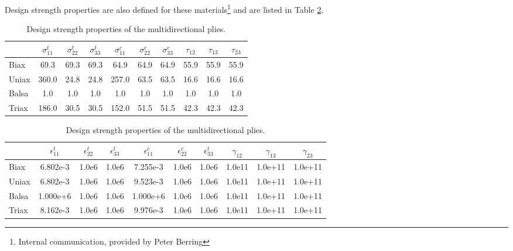 Design strength properties are also defined for these materials\footnote{Internal communication, provided by Peter Berring} and are listed in Table \ref{tab:matprops_strength}.

\begin{table}[h!]
\setlength\extrarowheight{2pt}
\centering
\begin{tabular}{lccccccccc}
\hline
\hline
	&$\sigma_{11}^t$ & $\sigma_{22}^t$  & $\sigma_{33}^t$  & $\sigma_{11}^c$  & $\sigma_{22}^c$  & $\sigma_{33}^c$  & $\tau_{12}$   & $\tau_{13}$   & $\tau_{23}$     \\
\hline
Biax	&	69.3         & 69.3  & 69.3  &  64.9 & 64.9  & 64.9  & 55.9 & 55.9 & 55.9 \\
Uniax	&	 360.0         & 24.8  & 24.8  & 257.0 & 63.5  & 63.5  & 16.6 & 16.6 & 16.6  \\
Balsa 	&	 1.0         &  1.0  &  1.0  &   1.0 &  1.0  &  1.0  &  1.0 &  1.0 &  1.0 \\
Triax 	&	186.0         & 30.5  & 30.5  & 152.0 & 51.5  & 51.5  & 42.3 & 42.3 & 42.3 \\
\hline
\hline
\end{tabular}
\caption{Design strength properties of the multidirectional plies.}
\label{tab:matprops_strength}
\end{table}


\begin{table}[h!]
\setlength\extrarowheight{2pt}
\centering
\begin{tabular}{lccccccccc}
\hline
\hline
	&$\epsilon_{11}^t$     & $\epsilon_{22}^t$ & $\epsilon_{33}^t$ & $\epsilon_{11}^c $   & $\epsilon_{22}^c$ & $\epsilon_{33}^t$ & $\gamma_{12}$    & $\gamma_{13} $    & $\gamma_{23}$     \\
\hline
Biax	&	 6.802e-3 & 1.0e6 & 1.0e6 & 7.255e-3 & 1.0e6 & 1.0e6 & 1.0e11 & 1.0e+11 & 1.0e+11 \\
Uniax	&	 6.802e-3 & 1.0e6 & 1.0e6 & 9.523e-3 & 1.0e6 & 1.0e6 & 1.0e11 & 1.0e+11 & 1.0e+11 \\
Balsa 	&	1.000e+6 & 1.0e6 & 1.0e6 & 1.000e+6 & 1.0e6 & 1.0e6 & 1.0e11 & 1.0e+11 & 1.0e+11 \\
Triax 	&	 8.162e-3 & 1.0e6 & 1.0e6 & 9.976e-3 & 1.0e6 & 1.0e6 & 1.0e11 & 1.0e+11 & 1.0e+11 \\
\hline
\hline
\end{tabular}
\caption{Design strength properties of the multidirectional plies.}
\label{tab:matprops_strength}
\end{table}

\clearpage

